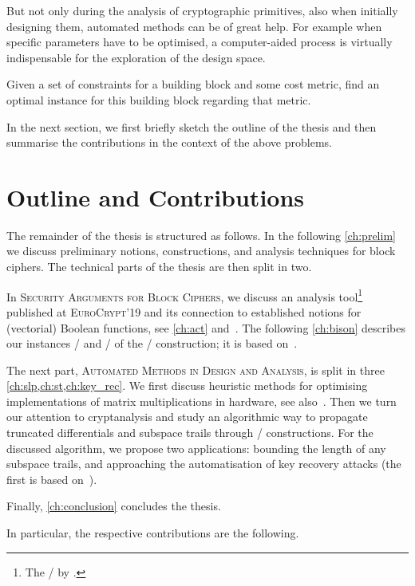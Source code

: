 But not only during the analysis of cryptographic primitives, also when initially designing them, automated methods can be of great help.
For example when specific parameters have to be optimised, a computer-aided process is virtually indispensable for the exploration of the design space.
\begin{problem}\label{prob:optimise_bb}
    Given a set of constraints for a building block and some cost metric, find an optimal instance for this building block regarding that metric.
\end{problem}

In the next section, we first briefly sketch the outline of the thesis and then summarise the contributions in the context of the above problems.

\section{Outline and Contributions}

The remainder of the thesis is structured as follows.
In the following \cref{ch:prelim} we discuss preliminary notions, constructions, and analysis techniques for block ciphers.
The technical parts of the thesis are then split in two.

In \textsc{Security Arguments for Block Ciphers}, we discuss an analysis tool\footnote{%
    The \DLCTl/ by \citeauthor{EC:BDKW19}.
} published at \textsc{EuroCrypt}'19 and its connection to established notions for (vectorial) Boolean functions, see \cref{ch:act} and~\cite{EPRINT:CanKolWie19}.
The following \cref{ch:bison} describes our instances \bison/ and \wisent/ of the \WSNs/ construction; it is based on~\cite{EC:CLLNW19}.

The next part, \textsc{Automated Methods in Design and Analysis}, is split in three \cref{ch:slp,ch:st,ch:key_rec}.
We first discuss heuristic methods for optimising implementations of matrix multiplications in hardware, see also~\cite{ToSC:KLSW17}.
Then we turn our attention to cryptanalysis and study an algorithmic way to propagate truncated differentials and subspace trails through \SPN/ constructions.
For the discussed algorithm, we propose two applications: bounding the length of any subspace trails, and approaching the automatisation of key recovery attacks (the first is based on~\cite{ToSC:LeaTezWie18}).

Finally, \cref{ch:conclusion} concludes the thesis.

In particular, the respective contributions are the following.

